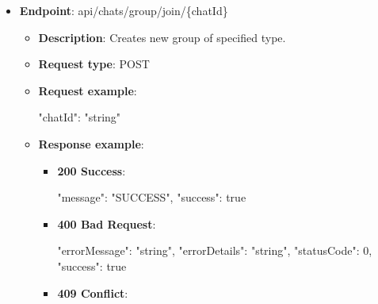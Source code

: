 \begin{itemize}
\begin{itemize}
\begin{itemize}
            \begin{spverbatim}
            {
                "errorMessage": "string",
                "errorDetails": "string",
                "statusCode": 0,
                "success": true
            }
            \end{spverbatim}
        \end{itemize}
        \item \textbf{Response messages}:
        \begin{enumerate}
            \item Success.
            \item User not found.
        \end{enumerate}
    \end{itemize}

    \item \textbf{Endpoint}: api/chats/group/join/\{chatId\}
    \begin{itemize}
        \item \textbf{Description}: Creates new group of specified type.
        \item \textbf{Request type}: POST
        \item \textbf{Request example}:
        \begin{spverbatim}
        {
            "chatId": "string"
        }
        \end{spverbatim}
        \item \textbf{Response example}:
        \begin{itemize}
            \item \textbf{200 Success}:

            \begin{spverbatim}
            {
                "message": "SUCCESS",
                "success": true
            }
            \end{spverbatim}

            \item \textbf{400 Bad Request}:

            \begin{spverbatim}
            {
                "errorMessage": "string",
                "errorDetails": "string",
                "statusCode": 0,
                "success": true
            }
            \end{spverbatim}

            \item \textbf{409 Conflict}:


\end{itemize}
\end{itemize}
\end{itemize}
